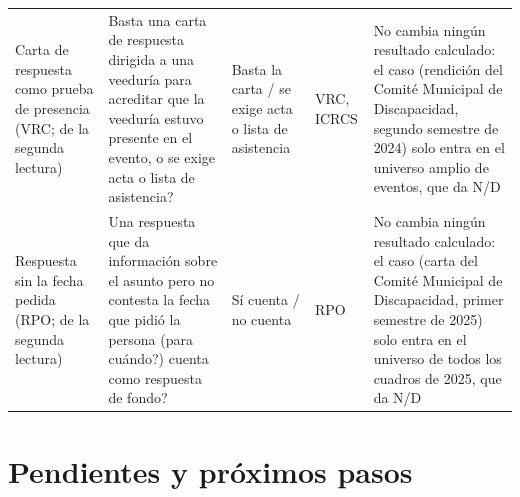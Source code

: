 \documentclass[11pt,letterpaper]{article}
\begin{document}
{\begin{xltabular}{\linewidth}{L{2.6cm}L{3.1cm}L{2.5cm}L{2.4cm}Y}
Carta de respuesta como prueba de presencia (VRC; de la segunda lectura) & \textquestiondown{}Basta una carta de respuesta dirigida a una veeduría para acreditar que la veeduría estuvo presente en el evento, o se exige acta o lista de asistencia? & Basta la carta / se exige acta o lista de asistencia & VRC, ICRCS & No cambia ningún resultado calculado: el caso (rendición del Comité Municipal de Discapacidad, segundo semestre de 2024) solo entra en el universo amplio de eventos, que da N/D \\
Respuesta sin la fecha pedida (RPO; de la segunda lectura) & \textquestiondown{}Una respuesta que da información sobre el asunto pero no contesta la fecha que pidió la persona (\guillemotleft{}\textquestiondown{}para cuándo?\guillemotright{}) cuenta como respuesta de fondo? & Sí cuenta / no cuenta & RPO & No cambia ningún resultado calculado: el caso (carta del Comité Municipal de Discapacidad, primer semestre de 2025) solo entra en el universo de todos los cuadros de 2025, que da N/D \\
\end{xltabular}
}

\section{Pendientes y próximos pasos}
\end{document}
